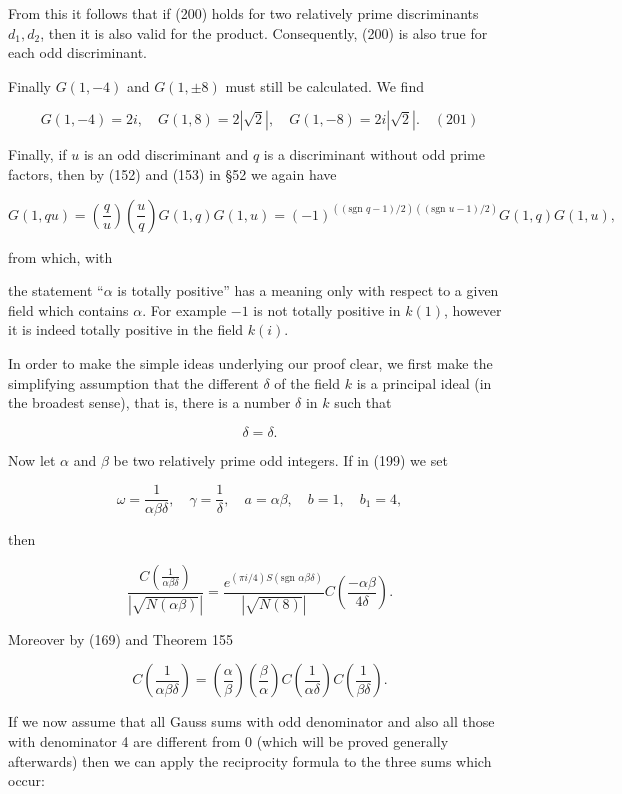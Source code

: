 From this it follows that if (200) holds for two relatively prime discriminants $d_1, d_2$, then it is also valid for the product. Consequently, (200) is also true for each odd discriminant.

Finally $G(1, -4)$ and $G(1, \pm 8)$ must still be calculated. We find

$$G(1, -4) = 2i, \quad G(1, 8) = 2|\sqrt{2}|, \quad G(1, -8) = 2i|\sqrt{2}|. \quad (201)$$

Finally, if $u$ is an odd discriminant and $q$ is a discriminant without odd prime factors, then by (152) and (153) in §52 we again have

$$G(1, qu) = \left( \frac{q}{u} \right) \left( \frac{u}{q} \right) G(1, q) G(1, u) = (-1)^{((\text{sgn } q - 1) / 2) ((\text{sgn } u - 1) / 2)} G(1, q) G(1, u),$$

from which, with

the statement “$\alpha$ is totally positive” has a meaning only with respect to a given field which contains $\alpha$. For example $-1$ is not totally positive in $k(1)$, however it is indeed totally positive in the field $k(i)$.

In order to make the simple ideas underlying our proof clear, we first make the simplifying assumption that the different $\delta$ of the field $k$ is a principal ideal (in the broadest sense), that is, there is a number $\delta$ in $k$ such that

$$\delta = \delta.$$

Now let $\alpha$ and $\beta$ be two relatively prime odd integers. If in (199) we set

$$\omega = \frac{1}{\alpha \beta \delta}, \quad \gamma = \frac{1}{\delta}, \quad a = \alpha \beta, \quad b = 1, \quad b_1 = 4,$$

then

$$\frac{C\left(\frac{1}{\alpha \beta \delta}\right)}{\left|\sqrt{N(\alpha \beta)}\right|} = \frac{e^{(\pi i/4)S(\text{sgn } \alpha \beta \delta)}}{\left|\sqrt{N(8)}\right|} C\left(\frac{-\alpha \beta}{4\delta}\right).$$

Moreover by (169) and Theorem 155

$$C\left(\frac{1}{\alpha \beta \delta}\right) = \left(\frac{\alpha}{\beta}\right)\left(\frac{\beta}{\alpha}\right) C\left(\frac{1}{\alpha \delta}\right) C\left(\frac{1}{\beta \delta}\right).$$

If we now assume that all Gauss sums with odd denominator and also all those with denominator 4 are different from 0 (which will be proved generally afterwards) then we can apply the reciprocity formula to the three sums which occur:

